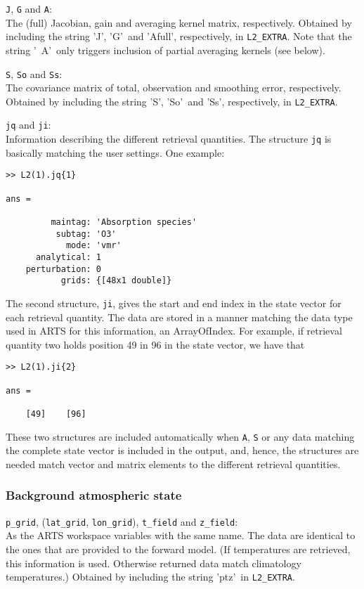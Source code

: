 \documentclass[a4paper,11pt]{article}
\newcommand{\newfield}{\vspace{1ex}\noindent}
\begin{document}
\newfield
\verb|J|, \verb|G| and \verb|A|:\\
The (full) Jacobian, gain and averaging kernel matrix, respectively.
Obtained by including the string \rq J\rq, \rq G\rq\ and \rq Afull\rq,
respectively, in \verb|L2_EXTRA|. Note that the string \rq\ A\rq\ only triggers
inclusion of partial averaging kernels (see below).

\newfield
\verb|S|, \verb|So| and \verb|Ss|:\\
The covariance matrix of total, observation and smoothing error, respectively.
Obtained by including the string \rq S\rq, \rq So\rq\ and \rq Ss\rq,
respectively, in \verb|L2_EXTRA|. 

\newfield
\verb|jq| and \verb|ji|:\\
Information describing the different retrieval quantities. The structure
\verb|jq| is basically matching the user settings. One example:
\begin{verbatim}
>> L2(1).jq{1}

ans = 

         maintag: 'Absorption species'
          subtag: 'O3'
            mode: 'vmr'
      analytical: 1
    perturbation: 0
           grids: {[48x1 double]}
\end{verbatim}
The second structure, \verb|ji|, gives the start and end index in the state
vector for each retrieval quantity. The data are stored in a manner
matching the data type used in ARTS for this information, an ArrayOfIndex. 
For example, if retrieval quantity two holds position 49 in 96 in the state
vector, we have that
\begin{verbatim}
>> L2(1).ji{2}

ans = 

    [49]    [96]
\end{verbatim}
These two structures are included automatically when \verb|A|, \verb|S| or any
data matching the complete state vector is included in the output, and, hence,
the structures are needed match vector and matrix elements to the different
retrieval quantities.



\subsubsection{Background atmospheric state}
%
\newfield \verb|p_grid|, (\verb|lat_grid|, \verb|lon_grid|), \verb|t_field| and
\verb|z_field|:\\
As the ARTS workspace variables with the same name. The data are identical to
the ones that are provided to the forward model. (If temperatures are retrieved,
this information is used. Otherwise returned data match climatology
temperatures.)
Obtained by including the string \rq ptz\rq\ in \verb|L2_EXTRA|.
\end{document}
